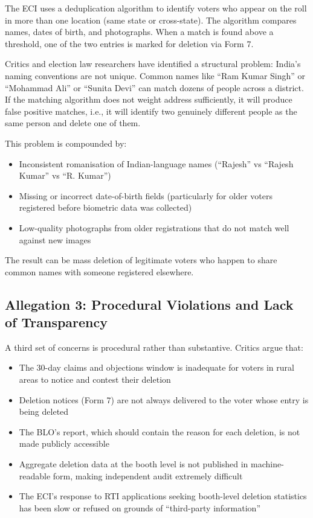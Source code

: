 \documentclass[11pt, a4paper]{article}
\begin{document}
The ECI uses a deduplication algorithm to identify voters who appear on the roll in more than one location (same state or cross-state). The algorithm compares names, dates of birth, and photographs. When a match is found above a threshold, one of the two entries is marked for deletion via Form 7.

Critics and election law researchers have identified a structural problem: India's naming conventions are not unique. Common names like ``Ram Kumar Singh'' or ``Mohammad Ali'' or ``Sunita Devi'' can match dozens of people across a district. If the matching algorithm does not weight address sufficiently, it will produce false positive matches, i.e., it will identify two genuinely different people as the same person and delete one of them.

This problem is compounded by:

\begin{itemize}[leftmargin=1.5em, itemsep=3pt]
  \item Inconsistent romanisation of Indian-language names (``Rajesh'' vs ``Rajesh Kumar'' vs ``R. Kumar'')
  \item Missing or incorrect date-of-birth fields (particularly for older voters registered before biometric data was collected)
  \item Low-quality photographs from older registrations that do not match well against new images
\end{itemize}

The result can be mass deletion of legitimate voters who happen to share common names with someone registered elsewhere.

\subsection{Allegation 3: Procedural Violations and Lack of Transparency}

A third set of concerns is procedural rather than substantive. Critics argue that:

\begin{itemize}[leftmargin=1.5em, itemsep=4pt]
  \item The 30-day claims and objections window is inadequate for voters in rural areas to notice and contest their deletion
  \item Deletion notices (Form 7) are not always delivered to the voter whose entry is being deleted
  \item The BLO's report, which should contain the reason for each deletion, is not made publicly accessible
  \item Aggregate deletion data at the booth level is not published in machine-readable form, making independent audit extremely difficult
  \item The ECI's response to RTI applications seeking booth-level deletion statistics has been slow or refused on grounds of ``third-party information''
\end{itemize}
\end{document}
